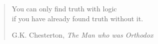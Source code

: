 \documentclass[12pt]{article}
\begin{document}
\newpage
\pagestyle{plain} \tableofcontents 
\newpage

\vspace*{2.5cm}
\begin{quote}
\raggedleft
{\sanssi
You can only find truth with logic\\
if you have already found truth without it.}\\
\bigskip

G.K. Chesterton, {\em The Man who was Orthodox}
\end{quote}

\clearfirst  \pagestyle{headings}




 \small\raggedright\frenchspacing



\end{document}
